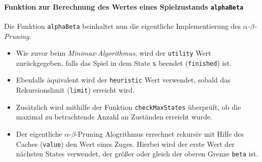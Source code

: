 \documentclass[11pt]{article}
\providecommand{\tightlist}{%
      \setlength{\itemsep}{0pt}\setlength{\parskip}{0pt}}
\begin{document}
    \hypertarget{funktion-zur-berechnung-des-wertes-eines-spielzustands-alphabeta}{%
\paragraph{\texorpdfstring{Funktion zur Berechnung des Wertes eines
Spielzustands
\texttt{alphaBeta}}{Funktion zur Berechnung des Wertes eines Spielzustands alphaBeta}}\label{funktion-zur-berechnung-des-wertes-eines-spielzustands-alphabeta}}

Die Funktion \texttt{alphaBeta} beinhaltet nun die eigentliche
Implementierung des \emph{$\alpha$-$\beta$-Pruning}.

\begin{itemize}
\tightlist
\item
  Wie zuvor beim \emph{Minimax-Algorithmus}, wird der \texttt{utility}
  Wert zurückgegeben, falls das Spiel in dem State \texttt{s} beendet
  (\texttt{finished}) ist.
\item
  Ebenfalls äquivalent wird der \texttt{heuristic} Wert verwendet,
  sobald das Rekursionslimit (\texttt{limit}) erreicht wird.
\item
  Zusätzlich wird mithilfe der Funktion \texttt{checkMaxStates}
  überprüft, ob die maximal zu betrachtende Anzahl an Zuständen erreicht
  wurde.
\item
  Der eigentliche $\alpha$-$\beta$-Pruning Alogrithmus errechnet rekursiv mit Hilfe
  des Caches (\texttt{value}) den Wert eines Zuges. Hierbei wird der
  erste Wert der nächsten States verwendet, der größer oder gleich der
  oberen Grenze \texttt{beta} ist.
\end{itemize}
\end{document}
